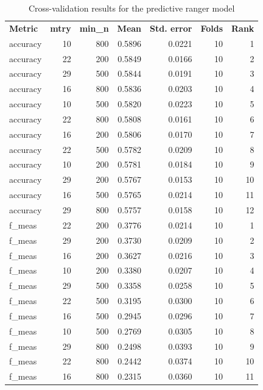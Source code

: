 \documentclass[
  11pt,
  a4paper,
]{article}
\begin{document}
\begin{longtable}[t]{>{\raggedright\arraybackslash}p{2.4cm}rrrrrr}

\caption{\label{tbl-appendix-ranger-cross-validation}Cross-validation
results for the predictive ranger model}

\tabularnewline

\\
\toprule
\textbf{Metric} & \textbf{mtry} & \textbf{min\_n} & \textbf{Mean} & \textbf{Std. error} & \textbf{Folds} & \textbf{Rank}\\
\midrule
accuracy & 10 & 800 & 0.5896 & 0.0221 & 10 & 1\\
accuracy & 22 & 200 & 0.5849 & 0.0166 & 10 & 2\\
accuracy & 29 & 500 & 0.5844 & 0.0191 & 10 & 3\\
accuracy & 16 & 800 & 0.5836 & 0.0203 & 10 & 4\\
accuracy & 10 & 500 & 0.5820 & 0.0223 & 10 & 5\\
\addlinespace
accuracy & 22 & 800 & 0.5808 & 0.0161 & 10 & 6\\
accuracy & 16 & 200 & 0.5806 & 0.0170 & 10 & 7\\
accuracy & 22 & 500 & 0.5782 & 0.0209 & 10 & 8\\
accuracy & 10 & 200 & 0.5781 & 0.0184 & 10 & 9\\
accuracy & 29 & 200 & 0.5767 & 0.0153 & 10 & 10\\
\addlinespace
accuracy & 16 & 500 & 0.5765 & 0.0214 & 10 & 11\\
accuracy & 29 & 800 & 0.5757 & 0.0158 & 10 & 12\\
f\_meas & 22 & 200 & 0.3776 & 0.0214 & 10 & 1\\
f\_meas & 29 & 200 & 0.3730 & 0.0209 & 10 & 2\\
f\_meas & 16 & 200 & 0.3627 & 0.0216 & 10 & 3\\
\addlinespace
f\_meas & 10 & 200 & 0.3380 & 0.0207 & 10 & 4\\
f\_meas & 29 & 500 & 0.3358 & 0.0258 & 10 & 5\\
f\_meas & 22 & 500 & 0.3195 & 0.0300 & 10 & 6\\
f\_meas & 16 & 500 & 0.2945 & 0.0296 & 10 & 7\\
f\_meas & 10 & 500 & 0.2769 & 0.0305 & 10 & 8\\
\addlinespace
f\_meas & 29 & 800 & 0.2498 & 0.0393 & 10 & 9\\
f\_meas & 22 & 800 & 0.2442 & 0.0374 & 10 & 10\\
f\_meas & 16 & 800 & 0.2315 & 0.0360 & 10 & 11\\

\end{longtable}
\end{document}

